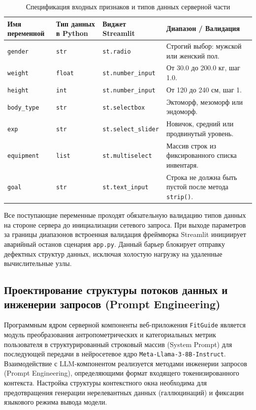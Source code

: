 \documentclass[14pt, a4paper]{extarticle}
\begin{document}
\begin{table}[h!]
\centering
\footnotesize
\caption{Спецификация входных признаков и типов данных серверной части}
\label{tab:variables_spec}
\begin{tabular}{|p{3.0cm}|p{2.5cm}|p{3.2cm}|p{5.0cm}|}
\hline
\textbf{Имя переменной} & \textbf{Тип данных в Python} & \textbf{Виджет Streamlit} & \textbf{Диапазон / Валидация} \\
\hline
\texttt{gender} & \texttt{str} & \texttt{st.radio} & Строгий выбор: мужской или женский пол. \\
\hline
\texttt{weight} & \texttt{float} & \texttt{st.number\_input} & От 30.0 до 200.0 кг, шаг 1.0. \\
\hline
\texttt{height} & \texttt{int} & \texttt{st.number\_input} & От 120 до 240 см, шаг 1. \\
\hline
\texttt{body\_type} & \texttt{str} & \texttt{st.selectbox} & Эктоморф, мезоморф или эндоморф. \\
\hline
\texttt{exp} & \texttt{str} & \texttt{st.select\_slider} & Новичок, средний или продвинутый уровень. \\
\hline
\texttt{equipment} & \texttt{list} & \texttt{st.multiselect} & Массив строк из фиксированного списка инвентаря. \\
\hline
\texttt{goal} & \texttt{str} & \texttt{st.text\_input} & Строка не должна быть пустой после метода \texttt{strip()}. \\
\hline
\end{tabular}
\end{table}

Все поступающие переменные проходят обязательную валидацию типов данных на стороне сервера до инициализации сетевого запроса. При выходе параметров за границы диапазонов встроенная валидация фреймворка Streamlit инициирует аварийный останов сценария \texttt{app.py}. Данный барьер блокирует отправку дефектных структур данных, исключая холостую нагрузку на удаленные вычислительные узлы.






\subsection{Проектирование структуры потоков данных и инженерии запросов (Prompt Engineering)}

Программным ядром серверной компоненты веб-приложения \texttt{FitGuide} является модуль преобразования антропометрических и категориальных метрик пользователя в структурированный строковый массив (System Prompt) для последующей передачи в нейросетевое ядро \texttt{Meta-Llama-3-8B-Instruct}. Взаимодействие с LLM-компонентом реализуется методами инженерии запросов (Prompt Engineering), определяющими формат входящего токенизированного контекста. Настройка структуры контекстного окна необходима для предотвращения генерации нерелевантных данных (галлюцинаций) и фиксации языкового режима вывода модели\cite{promt_eng,llama3}.
\end{document}
